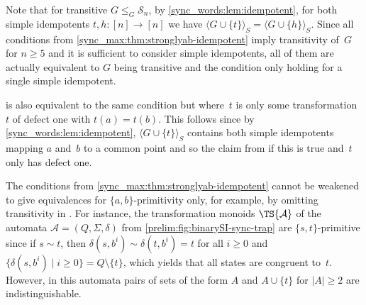 \begin{remark}
	Note that for transitive $G \le_G \mathcal S_n$,
	by \cref{sync_words:lem:idempotent},
	for both simple idempotents $t,h \colon [n] \to [n]$
	we have $\langle G \cup \{t\} \rangle_S = \langle G \cup \{h\} \rangle_S$.
	Since all conditions from \cref{sync_max:thm:stronglyab-idempotent} 
	imply transitivity of~$G$ for $n \ge 5$ and it is sufficient to consider simple idempotents,
	all of them are actually equivalent to $G$ being
	transitive and the condition only holding for a single
	simple idempotent.	
\end{remark}

\begin{remark}
	is also equivalent to the same condition but where~$t$
	is only some transformation~$t$ of defect one with $t(a) = t(b)$.
	This follows since by \cref{sync_words:lem:idempotent},
	$\langle G \cup \{t\} \rangle_S$ contains both simple idempotents
	mapping $a$ and~$b$ to a common point
	and so the claim from 
	if this is true and~$t$ only has defect one.		
\end{remark}

\begin{remark}
	The conditions from \cref{sync_max:thm:stronglyab-idempotent} cannot be weakened to give equivalences
	for $\{a,b\}$-primitivity only, for example, by omitting
	transitivity in .
	For instance, the transformation monoids $\TS{\mathcal A}$ of the automata $\mathcal A = (Q, \Sigma, \delta)$ 
	from \cref{prelim:fig:binarySI-sync-trap}
    are $\{s,t\}$-primitive	since if $s \sim t$, then $\delta(s, b^i) \sim \delta(t, b^i) = t$ for all $i \ge 0$
	and $\{ \delta(s, b^i) \mid i \ge 0 \} = Q \setminus \{t\}$, which yields
	that all states are congruent to~$t$.
	However, in this automata pairs of sets of the form $A$ and $A \cup \{t\}$
	for $|A| \ge 2$ are indistinguishable.
\end{remark}